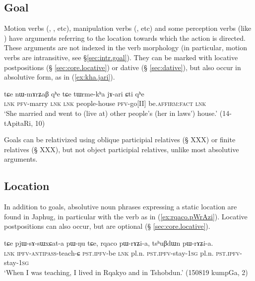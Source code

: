 \subsection{Goal} \label{absolutive.goal}  
Motion verbs (, ,  etc), manipulation verbs (,  etc) and some perception verbs (like ) have arguments referring to the location towards which the action is directed. These arguments are not indexed in the verb morphology (in particular, motion verbs are intransitive, see §\ref{sec:intr.goal}). They can be marked with locative postpositions (§ \ref{sec:core.locative}) or dative (§ \ref{sec:dative}), but also occur in absolutive form, as  in (\ref{ex:kha.jari}).

\begin{exe}
\ex \label{ex:kha.jari}
 \gll tɕe nɯ-mɤrʑaβ qʰe tɕe tɯrme-kʰa jɤ-ari ɕti qʰe  \\
 \textsc{lnk} \textsc{pfv}-marry \textsc{lnk}  \textsc{lnk} people-house \textsc{pfv}-go[II] be.\textsc{affirm}:\textsc{fact} \textsc{lnk} \\
\glt `She married and went to (live at) other people's (her in laws') house.' (14-tApitaRi, 10)
\end{exe}

Goals can be relativized using oblique participial relatives (§ XXX) or finite relatives (§ XXX), but not object participial relatives, unlike most absolutive arguments.

\subsection{Location} \label{absolutive.locative}
In addition to goals, absolutive noun phrases expressing a static location are found in Japhug, in particular with the verb  as in (\ref{ex:rqaco.pWrAzi}).  Locative postpositions can also occur, but are optional (§ \ref{sec:core.locative}).

\begin{exe}
\ex \label{ex:rqaco.pWrAzi}
 \gll  tɕe pjɯ-sɤ-sɯxɕat-a pɯ-ŋu tɕe, rqaco pɯ-rɤʑi-a, tsʰuβdɯn pɯ-rɤʑi-a. \\
 \textsc{lnk} \textsc{ipfv}-\textsc{antipass}-teach-ɕ \textsc{pst}.\textsc{ipfv}-be \textsc{lnk} pl.n. \textsc{pst}.\textsc{ipfv}-stay-\textsc{1sg} pl.n. \textsc{pst}.\textsc{ipfv}-stay-\textsc{1sg}  \\
 \glt `When I was teaching, I lived in Rqakyo and in Tshobdun.' (150819 kumpGa, 2)
\end{exe}

